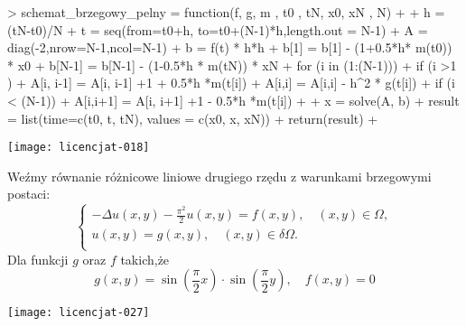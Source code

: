 \documentclass[notheorems]{beamer}
\begin{document}
\begin{frame}[fragile]
\begin{small}
\begin{Schunk}
\begin{Sinput}
> schemat_brzegowy_pelny = function(f, g, m , t0 , tN, x0, xN , N)
+ {
+   h = (tN-t0)/N
+   t = seq(from=t0+h, to=t0+(N-1)*h,length.out = N-1)
+   A = diag(-2,nrow=N-1,ncol=N-1)
+   b = f(t) * h*h
+   b[1] = b[1] - (1+0.5*h* m(t0)) * x0
+   b[N-1] = b[N-1] - (1-0.5*h * m(tN)) * xN
+   for (i in (1:(N-1))){
+     if (i >1 )
+       A[i, i-1] = A[i, i-1] +1 + 0.5*h *m(t[i])
+     A[i,i] = A[i,i] - h^2 * g(t[i])
+     if (i < (N-1))
+       A[i,i+1] =  A[i, i+1] +1 - 0.5*h *m(t[i])
+   }
+   x = solve(A, b)
+   result = list(time=c(t0, t, tN), values = c(x0, x, xN))
+   return(result)
+ }
\end{Sinput}
\end{Schunk}
\end{small}
\end{frame}
\begin{frame}
\texttt{[image: licencjat-018]}
\end{frame}
\begin{frame}
\begin{problem}
Weźmy równanie różnicowe liniowe drugiego rzędu z warunkami brzegowymi postaci:
$$
\left\lbrace
\begin{array}{c}
-\Delta u(x,y) - \frac{\pi^2}{2}u(x,y) = f(x,y), \quad (x,y) \in \Omega, \\
u(x,y) = g(x,y), \quad (x,y) \in \delta \Omega.\\
\end{array}
\right.
$$
Dla funkcji $g$ oraz $f$ takich,że
$$
g(x,y) = \sin(\frac{\pi}{2}x) \cdot \sin(\frac{\pi}{2}y), \quad f(x,y)=0
$$
\end{problem}
\end{frame}
\begin{frame}
\texttt{[image: licencjat-027]}
\end{frame}
\end{document}

